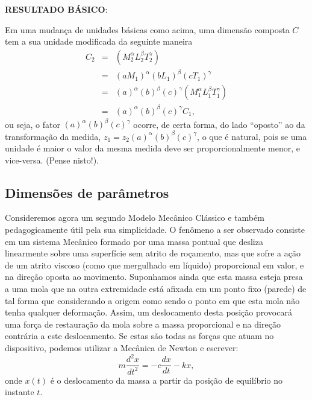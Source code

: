 \textbf{RESULTADO BÁSICO}:

    Em uma mudança de unidades básicas como acima, uma dimensão composta \(C\) tem a sua unidade modificada da seguinte maneira
    \[\begin{array}{rcl}
    C_{2}
    &=& (M_{2}^{\alpha} L_{2}^{\beta} T_{2}^{\gamma}) \\[0.2cm]
    &=& (aM_{1})^{\alpha} (bL_{1})^{\beta} (cT_{1})^{\gamma} \\[0.2cm]
    &=& (a)^{\alpha} (b)^{\beta} (c)^{\gamma} (M_{1}^{\alpha} L_{1}^{\beta} T_{1}^{\gamma}) \\[0.2cm]
    &=&  (a)^{\alpha} (b)^{\beta} (c)^{\gamma} C_{1},
    \end{array}\]
    ou seja, o fator \((a)^{\alpha} (b)^{\beta} (c)^{\gamma}\) ocorre, de certa forma, do lado ``oposto'' ao da transformação da medida, \(z_{1} = z_{2} (a)^{\alpha} (b)^{\beta} (c)^{\gamma}\), o que é natural, pois se uma unidade é maior o valor da mesma medida deve ser proporcionalmente menor, e vice-versa. (Pense nisto!).



\subsection{Dimensões de parâmetros}

    Consideremos agora um segundo Modelo Mecânico Clássico e também pedagogicamente útil pela sua simplicidade. O fenômeno a ser observado consiste em um sistema Mecânico formado por uma massa pontual que desliza linearmente sobre uma superfície sem atrito de roçamento, mas que sofre a ação de um atrito viscoso (como que mergulhado em líquido) proporcional em valor, e na direção oposta ao movimento. Suponhamos ainda que esta massa esteja presa a uma mola que na outra extremidade está afixada em um ponto fixo (parede) de tal forma que considerando a origem como sendo o ponto em que esta mola não tenha qualquer deformação. Assim, um deslocamento desta posição provocará uma força de restauração da mola sobre a massa proporcional e na direção contrária a este deslocamento. Se estas são todas as forças que atuam no dispositivo, podemos utilizar a Mecânica de Newton e escrever:
    \[m \dfrac{d^2x}{dt^{2}} = -c \dfrac{dx}{dt} - kx,\] onde \(x(t)\) é o deslocamento da massa a partir da posição de equilíbrio no instante \(t\).

